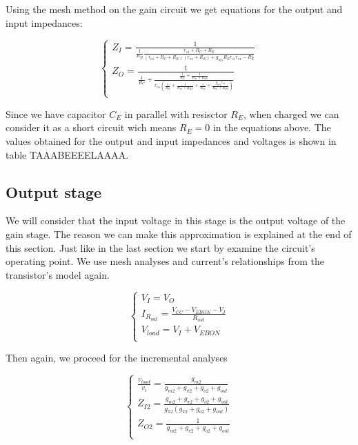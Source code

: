  Using the mesh method on the gain circuit we get equations for the output and input impedances:
 
 \begin{equation}\label{eq:v_eq}
\begin{cases}
Z_I=\frac{1}{\frac{1}{R_B} \frac{r_{o1}+R_{C}+R_{E}}{(r_{o1}+R_{C}+R_{E})(r_{\pi 1}+R_{E})+g_{m1} R_{E} r_{o1} r_{\pi 1} - R_{E}^2}}\\
Z_O= \frac{1}{\frac{1}{R_C} +\frac{\frac{1}{R_E}+\frac{1}{R_{\pi 1}+R_{BS}}}{r_{o1}(\frac{1}{R_E}+\frac{1}{R_{\pi 1}+R_{BS}}+\frac{1}{R_{o1}}+ \frac{g_{m1} r_{\pi 1}}{R_{\pi 1}+R_{BS}})}}\\
\end{cases}
\end{equation}

 Since we have capacitor $C_E$ in parallel with resisctor $R_E$, when charged we can consider it as a short circuit wich means $R_E=0$ in the equations above.
The values obtained for the output and input impedances and voltages is shown in table TAAABEEEELAAAA.

\subsection{Output stage}
We will consider that the input voltage in this stage is the output voltage of the gain stage. The reason we can make this approximation is explained at the end of this section.
Just like in the last section we start by examine the circuit's operating point.  We use mesh analyses and current's relationships from the transistor's model again.

\begin{equation}\label{eq:v_eq}
\begin{cases}
V_I=V_O\\
I_{R_{out}}= \frac{V_{CC}-V_{EBON}-V_I}{R_{out}}\\
V_{load}=V_I+ V_{EBON}\\
\end{cases}
\end{equation}

Then again, we proceed for the incremental analyses

\begin{equation}\label{eq:v_eq}
\begin{cases}
\frac{v_{load}}{v_i}=\frac{g_{m2}}{g_{m2}+g_{\pi 2}+g_{o2}+g_{out}}\\
Z_{I2}= \frac{g_{m2}+g_{\pi 2}+ g_{o2}+g_{out}}{g_{\pi 2} (g_{\pi 2}+ g_{o2}+g_{out})}\\
Z_{O2}= \frac{1}{g_{m2}+g_{\pi 2}+ g_{o2}+g_{out}}\\
\end{cases}
\end{equation}



